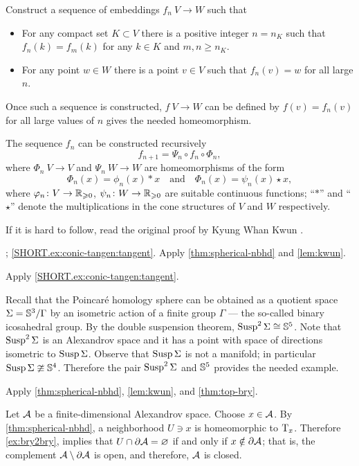 Construct a sequence of embeddings $f_n\:V\to W$
such that 
\begin{itemize}
\item 
For any compact set $K\subset V$ 
there is a positive integer $n=n_K$ such that 
$f_n(k)=f_m(k)$ for any $k\in K$ and $m, n \ge n_K$.
\item For any point $w\in W$ there is a point $v\in V$ such that $f_n(v)=w$ for all large $n$.
\end{itemize}

Once such a sequence is constructed, $f\:V\to W$ can be defined by $f(v)=f_n(v)$ for all large values of $n$ gives the needed homeomorphism.

The sequence $f_n$ can be constructed recursively
\[f_{n+1}=\Psi_n\circ f_n\circ \Phi_n,\]
where $\Phi_n\:V\to V$ 
and $\Psi_n\:W\to W$ 
are homeomorphisms
of the form 
\[\Phi_n(x)=\phi_n(x)\ast x\quad \text{and}\quad \Phi_n(x)=\psi_n(x)\star x,\]
where $\varphi_n\colon V\to \mathbb{R}_{\geqslant 0}$, $\psi_n\colon W\to \mathbb{R}_{\geqslant 0}$ are suitable continuous functions;
``$\ast$'' and ``$\star$'' denote the multiplications in the cone structures of $V$ and $W$ respectively.

 If it is hard to follow, read the original proof by Kyung Whan Kwun \cite{kwun1964}.

\parbf{\ref{ex:conic-tangent}}; \ref{SHORT.ex:conic-tangen:tangent}. Apply \ref{thm:spherical-nbhd} and \ref{lem:kwun}.

 Apply \ref{SHORT.ex:conic-tangen:tangent}.

 Recall that the Poincaré homology sphere can be obtained as a quotient space $\Sigma=\mathbb{S}^3/\Gamma$ by an isometric action of a finite group $\Gamma$  --- the so-called binary icosahedral group.
By the double suspension theorem,  $\mathop{\rm Susp}\nolimits^2\Sigma\cong\mathbb{S}^5$.
Note that $\mathop{\rm Susp}\nolimits^2\Sigma$ is an Alexandrov space and it has a point with space of directions isometric to $\mathop{\rm Susp}\nolimits\Sigma$.
Observe that $\mathop{\rm Susp}\nolimits\Sigma$ is not a manifold; in particular $\mathop{\rm Susp}\nolimits\Sigma\ncong\mathbb{S}^4$.
Therefore the pair $\mathop{\rm Susp}\nolimits^2\Sigma$ and $\mathbb{S}^5$ provides the needed example.

 Apply \ref{thm:spherical-nbhd}, \ref{lem:kwun}, and \ref{thm:top-bry}.

Let $\mathcal{A}$ be a finite-dimensional Alexandrov space.
Choose $x\in\mathcal{A}$.
By \ref{thm:spherical-nbhd}, a neighborhood $U\ni x$ is homeomorphic to $\mathrm{T}_x$.
Therefore \ref{ex:bry2bry}, implies that $U\cap\partial\mathcal{A}=\varnothing$ if and only if $x\notin \partial\mathcal{A}$;
that is, the complement $\mathcal{A}\setminus\partial\mathcal{A}$ is open, and therefore, $\mathcal{A}$ is closed.

